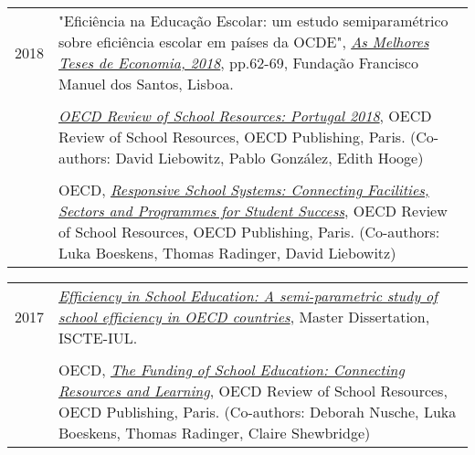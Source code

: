 \documentclass[a4paper,11pt]{article} %
\begin{document}
\begin{tabular}{r|p{13cm}}
	2018 &  "Eficiência na Educação Escolar: um estudo semiparamétrico sobre eficiência escolar em países da OCDE", \href{https://www.ffms.pt/FileDownload/d6e1656d-9dde-45e9-871f-0feb67c7d7f8/as-melhores-teses-de-economia-2018}{{\textit{As Melhores Teses de Economia, 2018}}}, pp.62-69, Fundação Francisco Manuel dos Santos, Lisboa.  \\
	 & \\
	 & \href{http://www.oecd.org/portugal/oecd-reviews-of-school-resources-portugal-2018-9789264308411-en.htm}{\textit{OECD Review of School Resources: Portugal 2018}}, OECD Review of School Resources, OECD Publishing, Paris. (Co-authors: David Liebowitz, Pablo González, Edith Hooge)\\
	 & \\
	& OECD,  \href{http://www.oecd.org/publications/responsive-school-systems-9789264306707-en.htm}{\textit{Responsive School Systems: Connecting Facilities, Sectors and Programmes for Student Success}}, OECD Review of School Resources, OECD Publishing, Paris. (Co-authors: Luka Boeskens, Thomas Radinger, David Liebowitz) \\
\end{tabular}	

\begin{tabular}{r|p{13cm}}
	2017 & \href{http://hdl.handle.net/10071/16122}{\textit{Efficiency in School Education: A semi-parametric study of school efficiency in OECD countries}}, Master Dissertation, ISCTE-IUL.\\
	& \\
	& OECD, \href{http://www.oecd.org/governance/the-funding-of-school-education-9789264276147-en.htm}{\textit{The Funding of School Education: Connecting Resources and Learning}}, OECD Review of School Resources, OECD Publishing, Paris. (Co-authors: Deborah Nusche, Luka Boeskens, Thomas Radinger, Claire Shewbridge)\\
\end{tabular}	

\newpage

\end{document}
